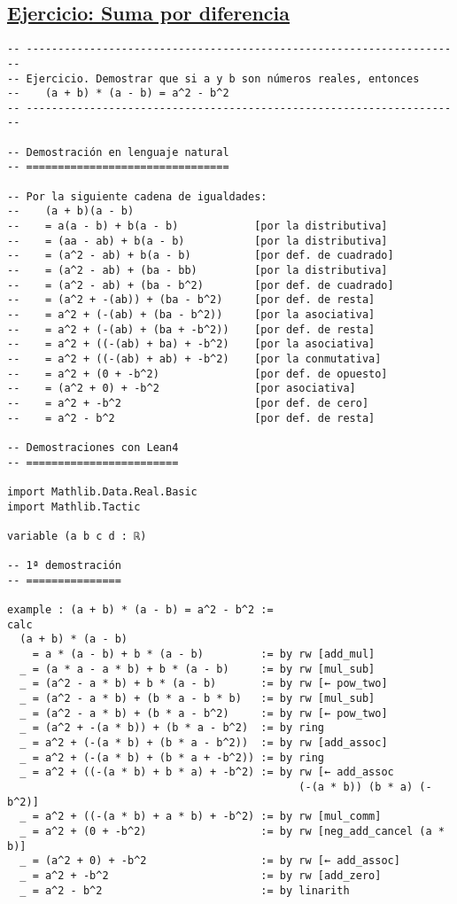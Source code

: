 \subsection{\href{./src/Basicos/Ejercicio\_Suma\_por\_diferencia.lean}{Ejercicio: Suma por diferencia}}
\label{sec:org9fe7348}
\begin{verbatim}
-- ---------------------------------------------------------------------
-- Ejercicio. Demostrar que si a y b son números reales, entonces
--    (a + b) * (a - b) = a^2 - b^2
-- ---------------------------------------------------------------------

-- Demostración en lenguaje natural
-- ================================

-- Por la siguiente cadena de igualdades:
--    (a + b)(a - b)
--    = a(a - b) + b(a - b)            [por la distributiva]
--    = (aa - ab) + b(a - b)           [por la distributiva]
--    = (a^2 - ab) + b(a - b)          [por def. de cuadrado]
--    = (a^2 - ab) + (ba - bb)         [por la distributiva]
--    = (a^2 - ab) + (ba - b^2)        [por def. de cuadrado]
--    = (a^2 + -(ab)) + (ba - b^2)     [por def. de resta]
--    = a^2 + (-(ab) + (ba - b^2))     [por la asociativa]
--    = a^2 + (-(ab) + (ba + -b^2))    [por def. de resta]
--    = a^2 + ((-(ab) + ba) + -b^2)    [por la asociativa]
--    = a^2 + ((-(ab) + ab) + -b^2)    [por la conmutativa]
--    = a^2 + (0 + -b^2)               [por def. de opuesto]
--    = (a^2 + 0) + -b^2               [por asociativa]
--    = a^2 + -b^2                     [por def. de cero]
--    = a^2 - b^2                      [por def. de resta]

-- Demostraciones con Lean4
-- ========================

import Mathlib.Data.Real.Basic
import Mathlib.Tactic

variable (a b c d : ℝ)

-- 1ª demostración
-- ===============

example : (a + b) * (a - b) = a^2 - b^2 :=
calc
  (a + b) * (a - b)
    = a * (a - b) + b * (a - b)         := by rw [add_mul]
  _ = (a * a - a * b) + b * (a - b)     := by rw [mul_sub]
  _ = (a^2 - a * b) + b * (a - b)       := by rw [← pow_two]
  _ = (a^2 - a * b) + (b * a - b * b)   := by rw [mul_sub]
  _ = (a^2 - a * b) + (b * a - b^2)     := by rw [← pow_two]
  _ = (a^2 + -(a * b)) + (b * a - b^2)  := by ring
  _ = a^2 + (-(a * b) + (b * a - b^2))  := by rw [add_assoc]
  _ = a^2 + (-(a * b) + (b * a + -b^2)) := by ring
  _ = a^2 + ((-(a * b) + b * a) + -b^2) := by rw [← add_assoc
                                              (-(a * b)) (b * a) (-b^2)]
  _ = a^2 + ((-(a * b) + a * b) + -b^2) := by rw [mul_comm]
  _ = a^2 + (0 + -b^2)                  := by rw [neg_add_cancel (a * b)]
  _ = (a^2 + 0) + -b^2                  := by rw [← add_assoc]
  _ = a^2 + -b^2                        := by rw [add_zero]
  _ = a^2 - b^2                         := by linarith


\end{verbatim}
